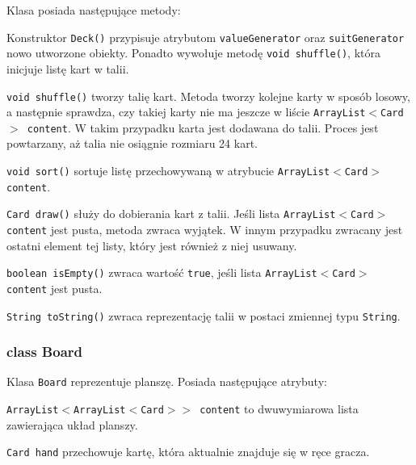 \documentclass{article}
\begin{document}
Klasa posiada następujące metody:

Konstruktor \texttt{Deck()} przypisuje atrybutom \texttt{valueGenerator} oraz \texttt{suitGenerator} nowo utworzone obiekty. Ponadto wywołuje metodę \texttt{void shuffle()}, która inicjuje listę kart w talii.

\texttt{void shuffle()} tworzy talię kart. Metoda tworzy kolejne karty w sposób losowy, a następnie sprawdza, czy takiej karty nie ma jeszcze w liście \texttt{ArrayList$<$Card$>$ content}. W takim przypadku karta jest dodawana do talii. Proces jest powtarzany, aż talia nie osiągnie rozmiaru 24 kart.

\texttt{void sort()} sortuje listę przechowywaną w atrybucie \texttt{ArrayList$<$Card$>$ content}.

\texttt{Card draw()} służy do dobierania kart z talii. Jeśli lista \texttt{ArrayList$<$Card$>$ content} jest pusta, metoda zwraca wyjątek. W innym przypadku zwracany jest ostatni element tej listy, który jest również z niej usuwany.

\texttt{boolean isEmpty()} zwraca wartość \texttt{true}, jeśli lista \texttt{ArrayList$<$Card$>$ content} jest pusta.

\texttt{String toString()} zwraca reprezentację talii w postaci zmiennej typu \texttt{String}.

\subsubsection*{class Board}

\begin{center}
\end{center}

Klasa \texttt{Board} reprezentuje planszę. Posiada następujące atrybuty:

\texttt{ArrayList$<$ArrayList$<$Card$>>$ content} to dwuwymiarowa lista zawierająca układ planszy.

\texttt{Card hand} przechowuje kartę, która aktualnie znajduje się w ręce gracza.
\end{document}
